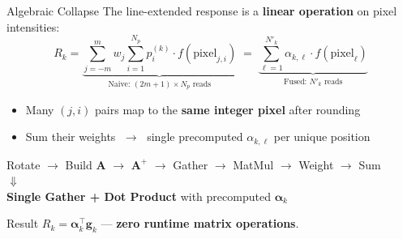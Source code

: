 \documentclass[10pt, aspectratio=169]{beamer}
\begin{document}
\begin{frame}{Algebraic Collapse}
  The line-extended response is a \textbf{linear operation} on pixel intensities:
  \begin{equation*}
    R_k = \underbrace{\sum_{j=-m}^{m} w_j \sum_{i=1}^{N_p} p_i^{(k)} \cdot f(\text{pixel}_{j,i})}_{\text{Naive: }(2m{+}1) \times N_p\text{ reads}}
    \;=\; \underbrace{\sum_{\ell=1}^{N'_k} \alpha_{k,\ell} \cdot f(\text{pixel}_\ell)}_{\text{Fused: }N'_k\text{ reads}}
  \end{equation*}

  \vspace{0.3em}
  \begin{itemize}
    \item Many $(j, i)$ pairs map to the \textbf{same integer pixel} after rounding
    \item Sum their weights $\;\to\;$ single precomputed $\alpha_{k,\ell}$ per unique position
  \end{itemize}

  \vspace{0.3em}
  \begin{center}
    {\small
    \color{UofSCRose}Rotate $\to$ Build $\mathbf{A}$ $\to$ $\mathbf{A}^+$ $\to$ Gather $\to$ MatMul $\to$ Weight $\to$ Sum}\\[0.4em]
    $\Downarrow$\\[0.4em]
    {\color{UofSCHorseshoe}\textbf{Single Gather\; + \;Dot Product}\; with precomputed $\boldsymbol{\alpha}_k$}
  \end{center}

  \vspace{0.3em}
  \begin{exampleblock}{Result}
    $R_k = \boldsymbol{\alpha}_k^\top \mathbf{g}_k$ \quad---\quad
    \textbf{zero runtime matrix operations}.
  \end{exampleblock}
\end{frame}
\end{document}
